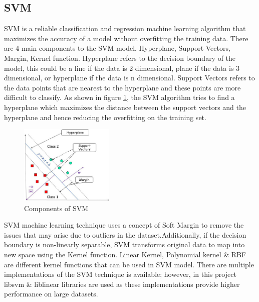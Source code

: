\documentclass[twoside,11pt,a4paper]{article}
\begin{document}
\subsection{\acf{SVM}}
\acs{SVM} is a reliable classification and regression machine learning algorithm that maximizes the accuracy of a model without overfitting the training data. There are 4 main components to the \acs{SVM} model, Hyperplane, Support Vectors, Margin, Kernel function. Hyperplane refers to the decision boundary of the model, this could be a line if the data is 2 dimensional, plane if the data is 3 dimensional, or hyperplane if the data is n dimensional. Support Vectors refers to the data points that are nearest to the hyperplane and  these points are more difficult to classify. As shown in figure \ref{fig:svm}, the \acs{SVM} algorithm tries to find a hyperplane which maximizes the distance between the support vectors and the hyperplane and hence reducing the overfitting on the training set.\\
\begin{figure}[ht]
	\centering
	\includegraphics[width=0.4\textwidth]{svm}
	\caption[Support Vector Machine]{Components of \acs{SVM} \citep{rani2022machine}}
	\label{fig:svm}
\end{figure}
\FloatBarrier
\acs{SVM} machine learning technique uses a concept of Soft Margin to remove the issues that may arise due to outliers in the dataset.Additionally, if the decision boundary is non-linearly separable, \acs{SVM} transforms original data to map into new space using the Kernel function. Linear Kernel, Polynomial kernel \& \acf{RBF} are different kernel functions that can be used in \acs{SVM} model. There are multiple implementations of the \acs{SVM} technique is available; however, in this project libsvm\citep{chang2011libsvm} \& liblinear \citep{fan2008liblinear} libraries are used as these implementations provide higher performance on large datasets.
\end{document}

